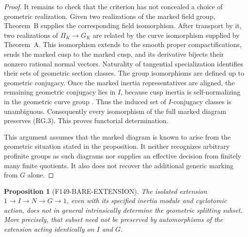 \documentclass[11pt,a4paper]{article}
\newtheorem{proposition}[theorem]{Proposition}
\theoremstyle{definition}
\begin{document}
\begin{proof}
It remains to check that the criterion has not concealed a choice
of geometric realization. Given two realizations of the marked
field group, Theorem~B supplies the corresponding field isomorphism.
After transport by it, two realizations of $\Pi_K\to G_K$ are
related by the curve isomorphism supplied by Theorem~A. This
isomorphism extends to the smooth proper compactifications, sends
the marked cusp to the marked cusp, and its derivative bijects
their nonzero rational normal vectors. Naturality of tangential
specialization identifies their sets of geometric section classes.
The group isomorphisms are defined up to geometric conjugacy.
Once the marked inertia representatives are aligned, the remaining
geometric conjugacy lies in $I$, because cusp inertia is
self-normalizing in the geometric curve group
\cite[Proposition~16, p.~8]{StixCuspidal2012}.
Thus the induced set of $I$-conjugacy classes is unambiguous.
Consequently every isomorphism of the full marked diagram
preserves (RG.3). This proves functorial determination.

This argument assumes that the marked diagram is known to arise
from the geometric situation stated in the proposition. It neither
recognizes arbitrary profinite groups as such diagrams nor supplies
an effective decision from finitely many finite quotients. It also
does not recover the additional generic marking from $G$ alone.
\end{proof}

\begin{proposition}[F149-BARE-EXTENSION]
\label{prop:archive-bare-extension}
The isolated extension $1\to I\to N\to G\to1$, even with its
specified inertia module and cyclotomic action, does not in general
intrinsically determine the geometric splitting subset. More
precisely, that subset need not be preserved by automorphisms of
the extension acting identically on $I$ and $G$.
\end{proposition}
\end{document}

